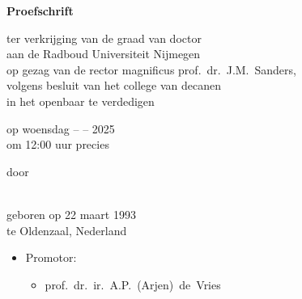 \begin{titlepage}
	\begin{center}
		\vspace*{3.5cm}
		
		\huge{\bfseries\mytitle}
		
		\vspace*{15pt}
		
		
		\vspace*{5pt}
		
		\normalsize
		
		\vspace{2.0cm}
		
		\textbf{Proefschrift}
		
		\vspace{0.5cm}
		
		ter verkrijging van de graad van doctor\\
		aan de Radboud Universiteit Nijmegen\\
		op gezag van de rector magnificus
		prof.~dr.~J.M.\ Sanders,\\
		volgens besluit van het college van decanen\\
		in het openbaar te verdedigen
		
		\vspace{0.5cm}
		
		op woensdag -- -- 2025\\
		\vspace{0.2cm}
		om 12:00 uur precies
		
		\vspace{0.5cm}
		
		door
		
		\vspace{0.5cm}
		
		\textbf{\myauthor}\\
		
		geboren op 22 maart 1993\\
		te Oldenzaal, Nederland
	\end{center}
\end{titlepage}

\newpage%

\thispagestyle{empty}

\begin{itemize}
	\item[] Promotor:
	\begin{itemize}
		\item[] prof.\ dr.\ ir.\ A.P.\ (Arjen)\ de\ Vries
	\end{itemize}
\end{itemize}

